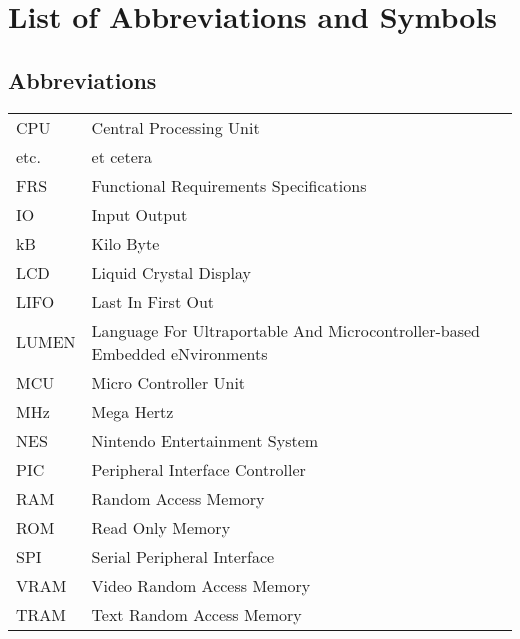 \chapter{List of Abbreviations and Symbols}
\section*{Abbreviations}
\begin{flushleft}
  \renewcommand{\arraystretch}{1.1}
  \begin{tabularx}{\textwidth}{@{}p{12mm}X@{}}
	
	CPU 	& Central Processing Unit 													\\
	etc. 	& et cetera 																\\
	FRS 	& Functional Requirements Specifications									\\
	IO 		& Input Output 																\\
	kB 		& Kilo Byte 																\\
	LCD 	& Liquid Crystal Display  													\\
	LIFO 	& Last In First Out 														\\
	LUMEN   & Language For Ultraportable And Microcontroller-based Embedded eNvironments\\
	MCU 	& Micro Controller Unit 													\\
	MHz 	& Mega Hertz 																\\
	NES 	& Nintendo Entertainment System 											\\
	PIC   	& Peripheral Interface Controller 											\\
	RAM 	& Random Access Memory 														\\
	ROM 	& Read Only Memory 															\\
	SPI 	& Serial Peripheral Interface												\\
	VRAM 	& Video Random Access Memory												\\
	TRAM	& Text Random Access Memory


  \end{tabularx}
\end{flushleft}
